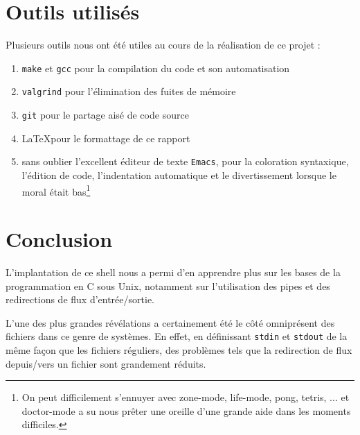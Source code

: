 \documentclass{article}
\begin{document}
\newpage

\section{Outils utilisés}

Plusieurs outils nous ont été utiles au cours de la réalisation de ce projet : 

\begin{enumerate}
\item \texttt{make} et \texttt{gcc} pour la compilation du code et son automatisation
\item \texttt{valgrind} pour l'élimination des fuites de mémoire
\item \texttt{git} pour le partage aisé de code source
\item \LaTeX pour le formattage de ce rapport
\item sans oublier l'excellent éditeur de texte \texttt{Emacs}, pour la coloration syntaxique, l'édition de code, l'indentation automatique et le divertissement lorsque le moral était bas\footnote{On peut difficilement s'ennuyer avec zone-mode, life-mode, pong, tetris, ... et doctor-mode a su nous prêter une oreille d'une grande aide dans les moments difficiles.}
\end{enumerate}

\section{Conclusion}

L'implantation de ce shell nous a permi d'en apprendre plus sur les bases de la programmation en C sous Unix, notamment sur l'utilisation des pipes et des redirections de flux d'entrée/sortie.

L'une des plus grandes révélations a certainement été le côté omniprésent des fichiers dans ce genre de systèmes. En effet, en définissant \texttt{stdin} et \texttt{stdout} de la même façon que les fichiers réguliers, des problèmes tels que la redirection de flux depuis/vers un fichier sont grandement réduits.
\end{document}
